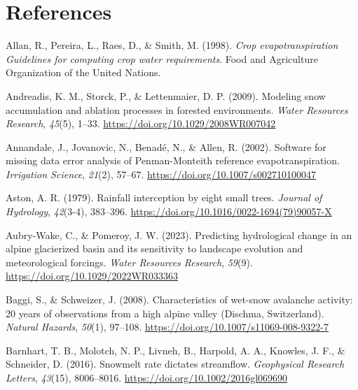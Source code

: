 \documentclass[
  letterpaper,
]{tex/uofsthesis-cs}
\newlength{\cslhangindent}
\newenvironment{CSLReferences}[2] %
 {\begin{list}{}{%
  \setlength{\itemindent}{0pt}
  \setlength{\leftmargin}{0pt}
  \setlength{\parsep}{0pt}
  \ifodd #1
   \setlength{\leftmargin}{\cslhangindent}
   \setlength{\itemindent}{-1\cslhangindent}
  \fi
  \setlength{\itemsep}{#2\baselineskip}}}
 {\end{list}}
\begin{document}
\pagebreak


\chapter*{References}\label{references}


\label{refs}
\begin{CSLReferences}{1}{0}
Allan, R., Pereira, L., Raes, D., \& Smith, M. (1998). \emph{Crop
evapotranspiration {Guidelines} for computing crop water requirements}.
{Food and Agriculture Organization of the United Nations}.

Andreadis, K. M., Storck, P., \& Lettenmaier, D. P. (2009). Modeling
snow accumulation and ablation processes in forested environments.
\emph{Water Resources Research}, \emph{45}(5), 1--33.
\url{https://doi.org/10.1029/2008WR007042}

Annandale, J., Jovanovic, N., Benadé, N., \& Allen, R. (2002). Software
for missing data error analysis of {Penman-Monteith} reference
evapotranspiration. \emph{Irrigation Science}, \emph{21}(2), 57--67.
\url{https://doi.org/10.1007/s002710100047}

Aston, A. R. (1979). Rainfall interception by eight small trees.
\emph{Journal of Hydrology}, \emph{42}(3-4), 383--396.
\url{https://doi.org/10.1016/0022-1694(79)90057-X}

Aubry-Wake, C., \& Pomeroy, J. W. (2023). Predicting hydrological change
in an alpine glacierized basin and its sensitivity to landscape
evolution and meteorological forcings. \emph{Water Resources Research},
\emph{59}(9). \url{https://doi.org/10.1029/2022WR033363}

Baggi, S., \& Schweizer, J. (2008). Characteristics of wet-snow
avalanche activity: 20 years of observations from a high alpine valley
({Dischma}, {Switzerland}). \emph{Natural Hazards}, \emph{50}(1),
97--108. \url{https://doi.org/10.1007/s11069-008-9322-7}

Barnhart, T. B., Molotch, N. P., Livneh, B., Harpold, A. A., Knowles, J.
F., \& Schneider, D. (2016). Snowmelt rate dictates streamflow.
\emph{Geophysical Research Letters}, \emph{43}(15), 8006--8016.
\url{https://doi.org/10.1002/2016gl069690}


\end{CSLReferences}
\end{document}
